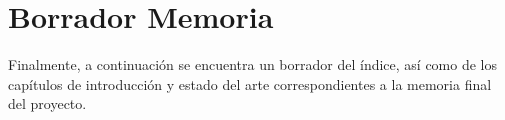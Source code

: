 






\frontmatter

% 


\mainmatter






\chapter{Borrador Memoria}
Finalmente, a continuación se encuentra un borrador del índice, así como de los capítulos de introducción y estado del arte correspondientes a la memoria final del proyecto.




\clearpage


